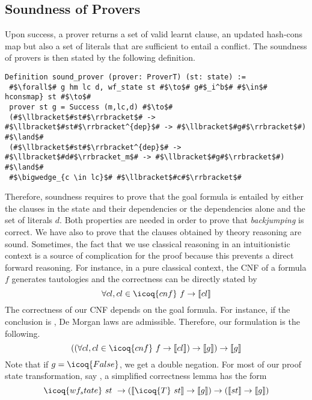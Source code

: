 \documentclass[utf8,a4paper,UKenglish,cleveref, autoref, thm-restate]{lipics-v2019}
\begin{document}
\subsection{Soundness of Provers}
Upon success, a prover  returns a set of valid learnt
clause, an updated hash-cons map but also a set of literals that are
sufficient to entail a conflict.  The soundness of provers is then
stated by the following definition.
\begin{verbatim}
Definition sound_prover (prover: ProverT) (st: state) :=
 #$\forall$# g hm lc d, wf_state st #$\to$# g#$_i^b$# #$\in$# hconsmap} st #$\to$#
 prover st g = Success (m,lc,d) #$\to$#
 (#$\llbracket$#st#$\rrbracket$# -> #$\llbracket$#st#$\rrbracket^{dep}$# -> #$\llbracket$#g#$\rrbracket$#) #$\land$#
 (#$\llbracket$#st#$\rrbracket^{dep}$# -> #$\llbracket$#d#$\rrbracket_m$# -> #$\llbracket$#g#$\rrbracket$#)  #$\land$#
 #$\bigwedge_{c \in lc}$# #$\llbracket$#c#$\rrbracket$#
\end{verbatim}
Therefore, soundness requires to prove that the goal formula 
is entailed by either the clauses in the state and their dependencies
or the dependencies alone and the set of literals $d$.
%
Both properties are needed in order to prove that \emph{backjumping} is correct.
We have also to prove that the clauses  obtained by theory reasoning are
sound. 
%
Sometimes, the fact that we use classical reasoning in an
intuitionistic context is a source of complication for the proof
because this prevents a direct forward reasoning. 
%
For instance, in a pure classical context, the CNF
of a formula $f$ generates tautologies and the correctness can be
directly stated by
\[
  \forall cl, cl \in \icoq{cnf}\ f \to \llbracket cl \rrbracket
\]
The correctness of our CNF depends on the goal formula. For instance,
if the conclusion is , De Morgan laws are admissible.
Therefore, our formulation is the following.
\[
  ((\forall cl, cl \in \icoq{cnf}\ f \to \llbracket cl \rrbracket) \to \llbracket g\rrbracket) \to \llbracket g\rrbracket
\]
Note that if $g=\icoq{False}$, we get a double negation.
For most of our proof state transformation, say , a simplified  correctness lemma has the form
\[
  \icoq{wf_state}\ st\ \to
  (\llbracket \icoq{T}\ st \rrbracket \to \llbracket g \rrbracket) \to 
  (\llbracket st \rrbracket \to \llbracket g \rrbracket)
\]
\end{document}
